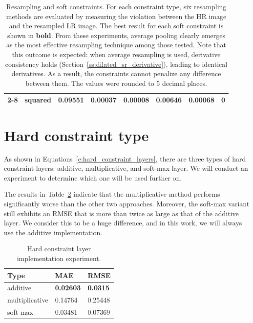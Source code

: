 \begin{landscape}
{\begin{table}[htbp]
\begin{tabular}{|l|c|l|l|l|l|l|l|}
        \cline{2-8}
        & squared & 0.09551 & 0.00037 & 0.00008 & 0.00646 & 0.00068 & \textbf{0} \\        
        \hline
    \end{tabular}
    \caption[Resampling and soft constraints]{Resampling and soft constraints. For each constraint type, six resampling methods are evaluated by measuring the violation between the HR image and the resampled LR image. The best result for each soft constraint is shown in \textbf{bold}. From these experiments, average pooling clearly emerges as the most effective resampling technique among those tested.
    Note that this outcome is expected: when average resampling is used, derivative consistency holds (Section~\ref{ss:dilated_sr_derivative}), leading to identical derivatives. 
    As a result, the constraints cannot penalize any difference between them.
    The values were rounded to 5 decimal places.
    }
    \label{tab:resampling_soft_exp}
\end{table}
}
\end{landscape}

\section{Hard constraint type}
\label{s:hard_constraint_exp}

As shown in Equations~\eqref{e:hard_constraint_layers}, there are three types of hard constraint layers: additive, multiplicative, and soft-max layer.
We will conduct an experiment to determine which one will be used further on.

The results in Table~\ref{tab:hard_constraint_implementation} indicate that the multiplicative method performs significantly worse than the other two approaches. 
Moreover, the soft-max variant still exhibits an RMSE that is more than twice as large as that of the additive layer.
We consider this to be a huge difference, and in this work, we will always use the additive implementation.

\begin{table}[htbp]
    \centering
    \begin{tabular}{|l|l|l|}
        \hline
         \textbf{Type} & \textbf{MAE} & \textbf{RMSE} \\
         \hline \hline
         additive & \textbf{0.02603} & \textbf{0.0315} \\
         \hline
         multiplicative & 0.14764 & 0.25448 \\
        \hline
        soft-max & 0.03481 & 0.07369 \\
        \hline
    \end{tabular}
    \caption[Hard constraint layer implementation experiment]{Hard constraint layer implementation experiment.}
    \label{tab:hard_constraint_implementation}
\end{table}

